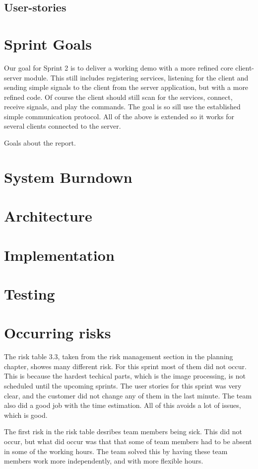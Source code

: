 \subsection{User-stories}

\section{Sprint Goals}
Our goal for Sprint 2 is to deliver a working demo with a more refined core client-server module. 
This still includes registering services, listening for the client and sending simple signals to the client from the server application, but with a more refined code. Of course the client should still scan for the services, connect, receive signals, and play the commands. 
The goal is so sill use the established simple communication protocol. All of the above is extended so it works for several clients connected to the server.

Goals about the report.

\section{System Burndown}
\section{Architecture}
\section{Implementation}
\section{Testing}
\section{Occurring risks}

The risk table 3.3, taken from the risk management section in the planning chapter, showes many different risk. 
For this sprint most of them did not occur. 
This is because the hardest techical parts, which is the image processing, is not scheduled until the upcoming sprints. 
The user stories for this sprint was very clear, and the customer did not change any of them in the last minute. The team also did a good job with the time estimation. All of this avoids a lot of issues, which is good. 

The first risk in the risk table desribes team members being sick. This did not occur, but what did occur was that that some of team members had to be absent in some of the working hours. 
The team solved this by having these team members work more independently, and with more flexible hours.  

